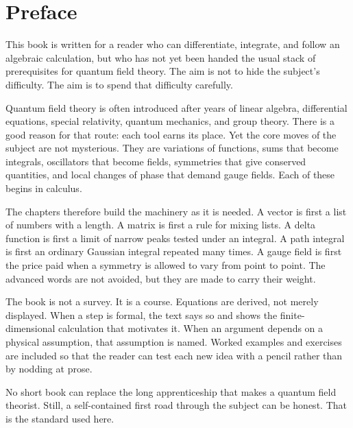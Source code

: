 \chapter*{Preface}

This book is written for a reader who can differentiate, integrate, and follow an algebraic calculation, but who has not yet been handed the usual stack of prerequisites for quantum field theory.  The aim is not to hide the subject's difficulty.  The aim is to spend that difficulty carefully.

Quantum field theory is often introduced after years of linear algebra, differential equations, special relativity, quantum mechanics, and group theory.  There is a good reason for that route: each tool earns its place.  Yet the core moves of the subject are not mysterious.  They are variations of functions, sums that become integrals, oscillators that become fields, symmetries that give conserved quantities, and local changes of phase that demand gauge fields.  Each of these begins in calculus.

The chapters therefore build the machinery as it is needed.  A vector is first a list of numbers with a length.  A matrix is first a rule for mixing lists.  A delta function is first a limit of narrow peaks tested under an integral.  A path integral is first an ordinary Gaussian integral repeated many times.  A gauge field is first the price paid when a symmetry is allowed to vary from point to point.  The advanced words are not avoided, but they are made to carry their weight.

The book is not a survey.  It is a course.  Equations are derived, not merely displayed.  When a step is formal, the text says so and shows the finite-dimensional calculation that motivates it.  When an argument depends on a physical assumption, that assumption is named.  Worked examples and exercises are included so that the reader can test each new idea with a pencil rather than by nodding at prose.

No short book can replace the long apprenticeship that makes a quantum field theorist.  Still, a self-contained first road through the subject can be honest.  That is the standard used here.

